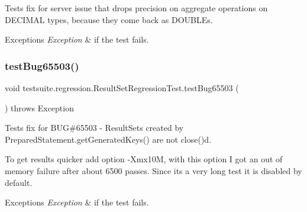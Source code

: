 Tests fix for server issue that drops precision on aggregate operations on D\+E\+C\+I\+M\+AL types, because they come back as D\+O\+U\+B\+L\+Es.


\begin{DoxyExceptions}{Exceptions}
{\em Exception} & if the test fails. \\
\hline
\end{DoxyExceptions}
\mbox{\label{classtestsuite_1_1regression_1_1_result_set_regression_test_aac9dd9e40e53b5f7b899b239d7c08406}} 
\subsubsection{\texorpdfstring{test\+Bug65503()}{testBug65503()}}
{\footnotesize\ttfamily void testsuite.\+regression.\+Result\+Set\+Regression\+Test.\+test\+Bug65503 (\begin{DoxyParamCaption}{ }\end{DoxyParamCaption}) throws Exception}

Tests fix for B\+UG\#65503 -\/ Result\+Sets created by Prepared\+Statement.\+get\+Generated\+Keys() are not close()d.

To get results quicker add option -\/\+Xmx10M, with this option I got an out of memory failure after about 6500 passes. Since it\textquotesingle{}s a very long test it is disabled by default.


\begin{DoxyExceptions}{Exceptions}
{\em Exception} & if the test fails. \\
\hline
\end{DoxyExceptions}
\mbox{\label{classtestsuite_1_1regression_1_1_result_set_regression_test_acd7be9d4220a08025d79f53a76395993}} 
